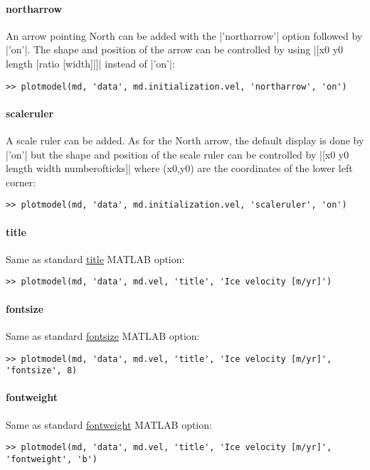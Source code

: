 \paragraph{northarrow}
An arrow pointing North can be added with the \lstinlinebg|'northarrow'| option followed by \lstinlinebg|'on'|. The shape and position of the arrow can be controlled by using \lstinlinebg|[x0 y0 length [ratio [width]]]| 
instead of \lstinlinebg|'on'|:
\begin{lstlisting}
>> plotmodel(md, 'data', md.initialization.vel, 'northarrow', 'on')
\end{lstlisting}

\paragraph{scaleruler}
A scale ruler can be added. As for the North arrow, the default display is done by \lstinlinebg|'on'| but the shape and position of the scale ruler can be controlled by \lstinlinebg|[x0 y0 length width numberofticks]| where (x0,y0) are the coordinates of the lower left corner:
\begin{lstlisting}
>> plotmodel(md, 'data', md.initialization.vel, 'scaleruler', 'on')
\end{lstlisting}

\paragraph{title}
Same as standard \href{http://www.mathworks.com/help/techdoc/ref/title.html}{title} MATLAB option:
\begin{lstlisting}
>> plotmodel(md, 'data', md.vel, 'title', 'Ice velocity [m/yr]')
\end{lstlisting}

\paragraph{fontsize}
Same as standard \href{http://www.mathworks.com/help/techdoc/ref/text_props.html}{fontsize} MATLAB option:
\begin{lstlisting}
>> plotmodel(md, 'data', md.vel, 'title', 'Ice velocity [m/yr]', 'fontsize', 8)
\end{lstlisting}

\paragraph{fontweight}
Same as standard \href{http://www.mathworks.com/help/techdoc/ref/text_props.html}{fontweight} MATLAB option:
\begin{lstlisting}
>> plotmodel(md, 'data', md.vel, 'title', 'Ice velocity [m/yr]', 'fontweight', 'b')
\end{lstlisting}

